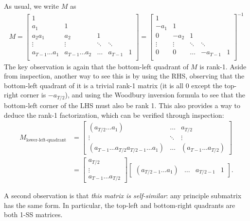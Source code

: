 \documentclass{article}
\begin{document}
As usual, we write $M$ as
\begin{align*}
  M =
  \begin{bmatrix}
    1 & \\
    a_1 & 1 & \\
    a_2a_1 & a_2 & 1 \\
    \vdots & \vdots & \ddots & \ddots \\
    a_{T-1}\dots a_1 & a_{T-1}\dots a_2 & \dots & a_{T-1} & 1 \\
  \end{bmatrix}
  =
  \begin{bmatrix}
    1 & \\
    -a_1 & 1 & \\
    0 & -a_2 & 1 \\
    \vdots & \vdots & \ddots & \ddots \\
    0 & 0 & \dots & -a_{T-1} & 1 \\
  \end{bmatrix}^{-1}
\end{align*}
The key observation is again that the bottom-left quadrant of $M$ is rank-1.
Aside from inspection, another way to see this is by using the RHS, observing that the bottom-left quadrant of it is a trivial rank-1 matrix (it is all 0 except the top-right corner is $-a_{T/2}$),
and using the Woodbury inversion formula to see that the bottom-left corner of the LHS must also be rank 1.
This also provides a way to deduce the rank-1 factorization,
which can be verified through inspection:
\begin{align*}
  M_{\text{lower-left-quadrant}}
  &=
  \begin{bmatrix}
    (a_{T/2} \dots a_1) & \dots & a_{T/2} \\
    \vdots & \ddots & \vdots \\
    (a_{T-1} \dots a_{T/2} a_{T/2-1} \dots a_1) & \dots & (a_{T-1} \dots a_{T/2})
  \end{bmatrix}
  \\
  &=
  \begin{bmatrix}
    a_{T/2} \\ \vdots \\ a_{T-1} \dots a_{T/2}
  \end{bmatrix}
  \begin{bmatrix}
    (a_{T/2-1} \dots a_1) & \dots & a_{T/2-1} & 1
  \end{bmatrix}
  .
\end{align*}

A second observation is that \emph{this matrix is self-similar}: any principle submatrix has the same form.
In particular, the top-left and bottom-right quadrants are both 1-SS matrices.
\end{document}
